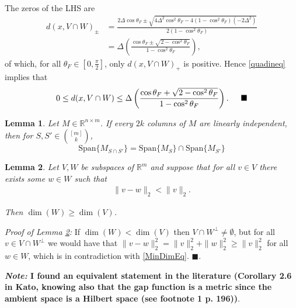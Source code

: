 \documentclass[journal,onecolumn]{IEEEtran}
\newtheorem{lemma}{Lemma}
\begin{document}
The zeros of the LHS are
\begin{align*}
d(x, V \cap W)_{\pm} &= \frac{ 2 \Delta \cos\theta_F \pm \sqrt{ 4\Delta^2\cos^2\theta_F - 4\left(1 - \cos^2\theta_F\right)\left(-2\Delta^2\right)} }{2 \left(1-\cos^2\theta_F\right)} \\
&= \Delta \left( \frac{ \cos\theta_F \pm \sqrt{2 - \cos^2\theta_F} }{1 - \cos^2\theta_F} \right),
\end{align*}
%
of which, for all $\theta_F \in [0, \frac{\pi}{2}]$, only $d(x, V \cap W)_{+}$ is positive. Hence \eqref{quadineq} implies that
\begin{align*}
0 \leq d(x, V \cap W) \leq \Delta \left( \frac{ \cos\theta_F + \sqrt{2 - \cos^2\theta_F} }{1 - \cos^2\theta_F} \right). \indent \blacksquare
\end{align*}


\begin{lemma}\label{SpanIntersectionLemma}
Let $M \in \mathbb{R}^{n \times m}$. If every $2k$ columns of $M$ are linearly independent, then for $S,S' \in {[m] \choose k}$,
\begin{equation}
\text{Span}\{M_{S \cap S'}\} = \text{Span}\{M_{S}\} \cap \text{Span}\{M_{S'}\}
\end{equation}
\end{lemma}



\begin{lemma}\label{MinimalDimensionLemma}
Let $V,W$ be subspaces of $\mathbb{R}^m$ and suppose that for all $v \in V$ there exists some $w \in W$ such that
\begin{align}\label{MinDimEq}
\|v - w\|_2 < \|v\|_2.
\end{align}

Then $\dim(W) \geq  \dim(V)$.
\end{lemma}

\emph{Proof of Lemma \ref{MinimalDimensionLemma}:} If $\dim(W) < \dim(V)$ then $V \cap W^\perp \neq \emptyset$, but for all $v \in V \cap W^\perp$ we would have that $\|v - w\|_2^2 = \|v\|_2^2 + \|w\|_2^2 \geq \|v\|_2^2$ for all $w \in W$, which is in contradiction with \eqref{MinDimEq}. \indent $\blacksquare$.

\textbf{\emph{Note:} I found an equivalent statement in the literature (Corollary 2.6 in Kato, knowing also that the gap function is a metric since the ambient space is a Hilbert space (see footnote 1 p. 196))}.
\end{document}
